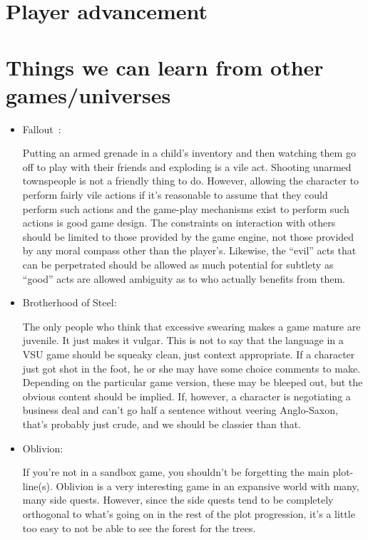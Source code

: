 \section{Player advancement}

\section{Things we can learn from other games/universes}

\begin{itemize}
\item Fallout~\cite{FalloutRPG}:

Putting an armed grenade in a child's inventory and then watching them
go off to play with their friends and exploding is a vile
act. Shooting unarmed townspeople is not a friendly thing to
do. However, allowing the character to perform fairly vile actions if
it's reasonable to assume that they could perform such actions and the
game-play mechanisms exist to perform such actions is good game
design. The constraints on interaction with others should be limited
to those provided by the game engine, not those provided by any moral
compass other than the player's. Likewise, the ``evil'' acts that can be perpetrated should be allowed as much potential for subtlety as ``good'' acts are allowed ambiguity as to who actually benefits from them. 

\item Brotherhood of Steel:

The only people who think that excessive swearing makes a game mature
are juvenile. It just makes it vulgar. This is not to say that the
language in a VSU game should be squeaky clean, just context
appropriate. If a character just got shot in the foot, he or she may
have some choice comments to make. Depending on the particular game
version, these may be bleeped out, but the obvious content should be
implied. If, however, a character is negotiating a business deal and
can't go half a sentence without veering Anglo-Saxon, that's probably
just crude, and we should be classier than that.

\item Oblivion:

If you're not in a sandbox game, you shouldn't be forgetting the main
plot-line(s).  Oblivion is a very interesting game in an expansive
world with many, many side quests. However, since the side quests tend
to be completely orthogonal to what's going on in the rest of the plot
progression, it's a little too easy to not be able to see the forest
for the trees.


\end{itemize}
